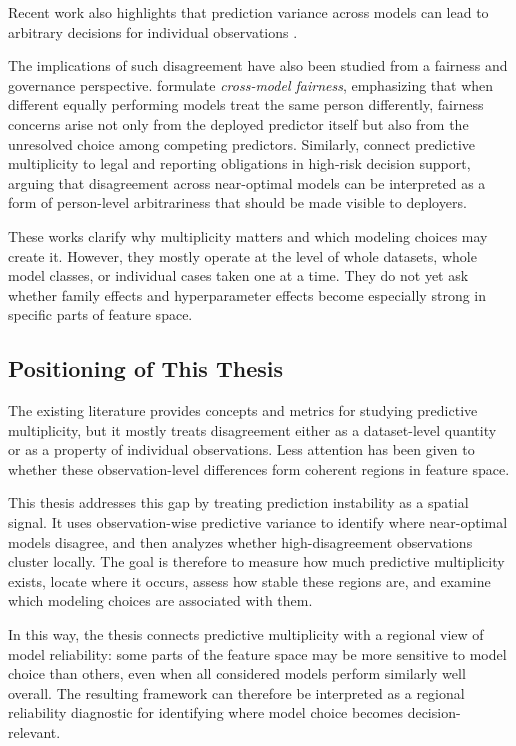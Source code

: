 Recent work also highlights that prediction variance across models can lead to
arbitrary decisions for individual observations \citep{cooper2024arbitrariness}.

The implications of such disagreement have also been studied from a fairness and
governance perspective. \cite{sokol_cross-model_2024} formulate
\emph{cross-model fairness}, emphasizing that when different equally performing models
treat the same person differently, fairness concerns arise not only from the deployed
predictor itself but also from the unresolved choice among competing predictors.
Similarly, \cite{frohnapfel_using_2026} connect predictive multiplicity to legal and
reporting obligations in high-risk decision support, arguing that disagreement across
near-optimal models can be interpreted as a form of person-level arbitrariness that should
be made visible to deployers.

These works clarify why multiplicity matters and which modeling choices may create it.
However, they mostly operate at the level of whole datasets, whole model classes, or
individual cases taken one at a time. They do not yet ask whether family effects and
hyperparameter effects become especially strong in specific parts of feature space.


\subsection{Positioning of This Thesis}

The existing literature provides concepts and metrics for studying predictive
multiplicity, but it mostly treats disagreement either as a dataset-level quantity or as a
property of individual observations. Less attention has been given to whether these
observation-level differences form coherent regions in feature space.

This thesis addresses this gap by treating prediction instability as a spatial signal. It uses
observation-wise predictive variance to identify where near-optimal models disagree, and
then analyzes whether high-disagreement observations cluster locally. The goal is therefore to 
measure how much predictive multiplicity exists, locate where it occurs, assess how stable these regions
are, and examine which modeling choices are associated with them.

In this way, the thesis connects predictive multiplicity with a regional view of model
reliability: some parts of the feature space may be more sensitive to model choice than
others, even when all considered models perform similarly well overall. The resulting
framework can therefore be interpreted as a regional reliability diagnostic for identifying
where model choice becomes decision-relevant.